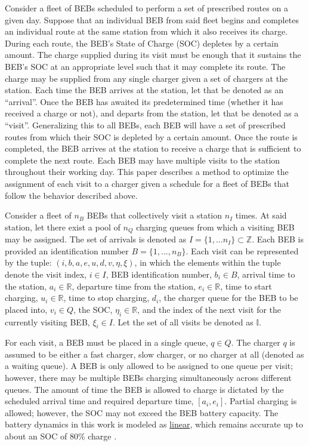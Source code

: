 \documentclass[11pt,a4paper,final]{article}
\newcommand{\visit}{(i, b, a, e, u, d, v, \eta, \xi)}
\newcommand{\I}{\mathbb{I}}                 %
\newcommand{\Iset}{I}                       %
\newcommand{\Qset}{Q}                       %
\begin{document}
Consider a fleet of BEBs scheduled to perform a set of prescribed routes on a given day. Suppose that an individual BEB
from said fleet begins and completes an individual route at the same station from which it also receives its charge.
During each route, the BEB's State of Charge (SOC) depletes by a certain amount. The charge supplied during its visit
must be enough that it sustains the BEB's SOC at an appropriate level such that it may complete its route. The charge
may be supplied from any single charger given a set of chargers at the station. Each time the BEB arrives at the
station, let that be denoted as an ``arrival''. Once the BEB has awaited its predetermined time (whether it has received a
charge or not), and departs from the station, let that be denoted as a ``visit''. Generalizing this to all BEBs, each BEB
will have a set of prescribed routes from which their SOC is depleted by a certain amount. Once the route is completed,
the BEB arrives at the station to receive a charge that is sufficient to complete the next route. Each BEB may have
multiple visits to the station throughout their working day. This paper describes a method to optimize the assignment of
each visit to a charger given a schedule for a fleet of BEBs that follow the behavior described above.

Consider a fleet of \(n_B\) BEBs that collectively visit a station \(n_I\) times. At said station, let there exist a pool of
\(n_Q\) charging queues from which a visiting BEB may be assigned. The set of arrivals is denoted as \(\Iset = \{ 1, ...
n_I \} \subset \mathbb{Z}\). Each BEB is provided an identification number \(B = \{ 1, ..., n_B \}\). Each visit can be represented by the
tuple: \(\visit\), in which the elements within the tuple denote the visit index, \(i \in I\), BEB identification number, \(b_i
\in B\), arrival time to the station, \(a_i \in \mathbb{R}\), departure time from the station, \(e_i \in \mathbb{R}\), time to start charging, \(u_i \in
\mathbb{R}\), time to stop charging, \(d_i\), the charger queue for the BEB to be placed into, \(v_i \in Q\), the SOC, \(\eta_i \in \mathbb{R}\), and
the index of the next visit for the currently visiting BEB, \(\xi_i \in I\). Let the set of all visits be denoted as \(\I\).

For each visit, a BEB must be placed in a single queue, \(q \in \Qset\). The charger \(q\) is assumed to be either a fast
charger, slow charger, or no charger at all (denoted as a waiting queue). A BEB is only allowed to be assigned to one
queue per visit; however, there may be multiple BEBs charging simultaneously across different queues. The amount of time
the BEB is allowed to charge is dictated by the scheduled arrival time and required departure time, \([a_i, e_i]\).
Partial charging is allowed; however, the SOC may not exceed the BEB battery capacity. The battery dynamics in this work
is modeled as \uline{linear}, which remains accurate up to about an SOC of 80\% charge \cite{li-2016-batter-elect}.
\end{document}
